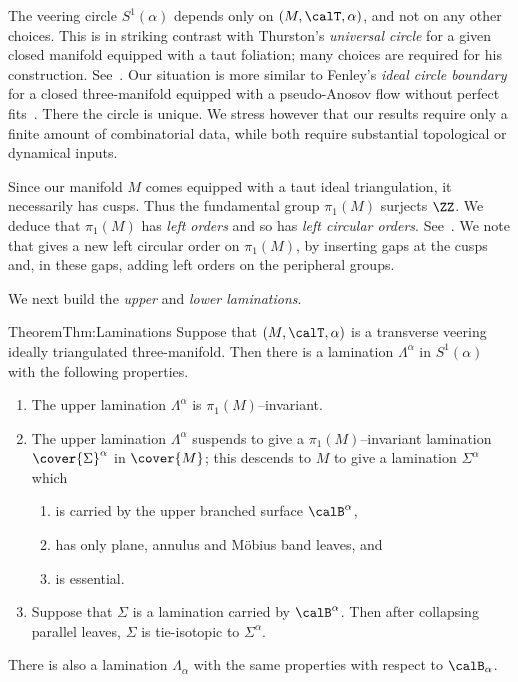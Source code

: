\documentclass[12pt]{amsart}
\begin{document}
The veering circle $S^1(\alpha)$ depends only on $(M, \calT, \alpha)$, and not on any other choices. This is in striking contrast with Thurston's \emph{universal circle} for a given closed manifold equipped with a taut foliation; many choices are required for his construction. See~\cite[Remark~6.27]{CalegariDunfield03}.  Our situation is more similar to Fenley's \emph{ideal circle boundary} for a closed three-manifold equipped with a pseudo-Anosov flow without perfect fits~\cite[Theorem A]{Fenley12}.  There the circle is unique.  We stress however that our results require only a finite amount of combinatorial data, while \cite{CalegariDunfield03, Fenley12} both require substantial topological or dynamical inputs.


\begin{remark}
Since our manifold $M$ comes equipped with a taut ideal triangulation, it necessarily has cusps.  Thus the fundamental group $\pi_1(M)$ surjects $\ZZ$.  We deduce that $\pi_1(M)$ has \emph{left orders} and so has \emph{left circular orders}. See~\cite[Definitions~2.26 and~2.40]{Calegari07}.  
We note that  gives a new left circular order on $\pi_1(M)$, by inserting gaps at the cusps and, in these gaps, adding left orders on the peripheral groups.   
\end{remark}

We next build the \emph{upper} and \emph{lower laminations}.  

\begin{restate}{Theorem}{Thm:Laminations}
Suppose that $(M, \calT, \alpha)$ is a transverse veering ideally triangulated three-manifold.  
Then there is a lamination $\Lambda^\alpha$ in $S^1(\alpha)$ with the following properties.
\begin{enumerate}
\item 
The upper lamination  $\Lambda^\alpha$ is $\pi_1(M)$--invariant.
\item 
The upper lamination $\Lambda^\alpha$ suspends to give a $\pi_1(M)$--invariant lamination $\cover{\Sigma}^\alpha$ in $\cover{M}$; this descends to $M$ to give a lamination $\Sigma^\alpha$ which 
\begin{enumerate}
\item
is carried by the upper branched surface $\calB^\alpha$, 
\item
has only plane, annulus and M\"obius band leaves, and
\item
is essential.
\end{enumerate}
\item 
Suppose that $\Sigma$ is a lamination carried by $\calB^\alpha$.  Then after collapsing parallel leaves, $\Sigma$ is tie-isotopic to $\Sigma^\alpha$.
\end{enumerate}
There is also a lamination $\Lambda_\alpha$ with the same properties with respect to $\calB_\alpha$. 
\end{restate}
\end{document}

